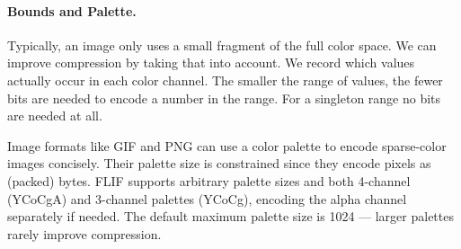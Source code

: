 \documentclass{article}
\begin{document}
\paragraph{Bounds and Palette.}
Typically, an image only uses a small fragment of the full color space. We can improve compression by
taking that into account.
%
We record which values actually occur in each color channel. %
The smaller the range of values, the fewer bits are needed to encode a number in the range.
For a singleton range %
no bits are needed at all.

Image formats like GIF and PNG can use a color palette
to encode sparse-color images concisely.
Their palette size is constrained since they encode pixels as (packed) bytes.
FLIF supports arbitrary palette sizes and
both 4-channel (YCoCgA) and 3-channel palettes (YCoCg), encoding the
alpha channel separately if needed.
The default maximum palette size is 1024 --- larger palettes rarely improve compression.



\end{document}
